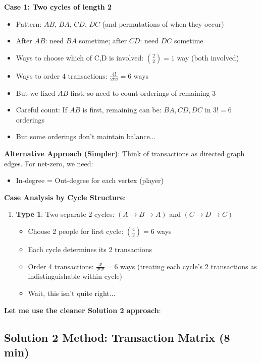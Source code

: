 \documentclass[]{article}
\begin{document}
\begin{solutionbox}
\textbf{Case 1: Two cycles of length 2}
\begin{itemize}
    \item Pattern: $AB$, $BA$, $CD$, $DC$ (and permutations of when they occur)
    \item After $AB$: need $BA$ sometime; after $CD$: need $DC$ sometime
    \item Ways to choose which of C,D is involved: $\binom{2}{2} = 1$ way (both involved)
    \item Ways to order 4 transactions: $\frac{4!}{2!2!} = 6$ ways
    \item But we fixed $AB$ first, so need to count orderings of remaining 3
    \item Careful count: If $AB$ is first, remaining can be: $BA,CD,DC$ in $3! = 6$ orderings
    \item But some orderings don't maintain balance...
\end{itemize}

\textbf{Alternative Approach (Simpler)}: Think of transactions as directed graph edges. For net-zero, we need:
\begin{itemize}
    \item In-degree = Out-degree for each vertex (player)
\end{itemize}

\textbf{Case Analysis by Cycle Structure}:
\begin{enumerate}
    \item \textbf{Type 1}: Two separate 2-cycles: $(A \to B \to A)$ and $(C \to D \to C)$
    \begin{itemize}
        \item Choose 2 people for first cycle: $\binom{4}{2} = 6$ ways
        \item Each cycle determines its 2 transactions
        \item Order 4 transactions: $\frac{4!}{2!2!} = 6$ ways (treating each cycle's 2 transactions as indistinguishable within cycle)
        \item Wait, this isn't quite right...
    \end{itemize}
\end{enumerate}

\textbf{Let me use the cleaner Solution 2 approach}:

\subsection*{Solution 2 Method: Transaction Matrix (8 min)}


\end{solutionbox}
\end{document}
